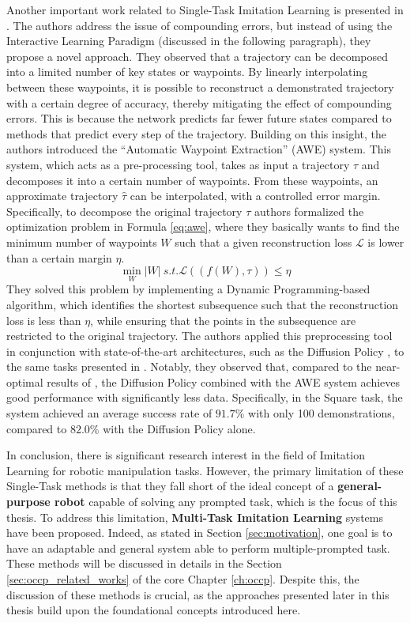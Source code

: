 Another important work related to Single-Task Imitation Learning is presented in \cite{shi2023waypoint}. The authors address the issue of compounding errors, but instead of using the Interactive Learning Paradigm (discussed in the following paragraph), they propose a novel approach. They observed that a trajectory can be decomposed into a limited number of key states or waypoints. By linearly interpolating between these waypoints, it is possible to reconstruct a demonstrated trajectory with a certain degree of accuracy, thereby mitigating the effect of compounding errors. This is because the network predicts far fewer future states compared to methods that predict every step of the trajectory. Building on this insight, the authors introduced the ``Automatic Waypoint Extraction'' (AWE) system. This system, which acts as a pre-processing tool, takes as input a trajectory $\tau$ and decomposes it into a certain number of waypoints. From these waypoints, an approximate trajectory $\hat{\tau}$ can be interpolated, with a controlled error margin.
Specifically, to decompose the original trajectory $\tau$ authors formalized the optimization problem in Formula \ref{eq:awe}, where they basically wants to find the minimum number of waypoints $W$ such that a given reconstruction loss $\mathcal{L}$ is lower than a certain margin $\eta$.
\begin{equation}
    \label{eq:awe}
    \min_{W} |W|  \ s.t. \mathcal{L}((f(W), \tau)) \le \eta
\end{equation}
They solved this problem by implementing a Dynamic Programming-based algorithm, which identifies the shortest subsequence such that the reconstruction loss is less than $\eta$, while ensuring that the points in the subsequence are restricted to the original trajectory. The authors applied this preprocessing tool in conjunction with state-of-the-art architectures, such as the Diffusion Policy \cite{cheng2023diffusion}, to the same tasks presented in \cite{mandlekar2022matters}. Notably, they observed that, compared to the near-optimal results of \cite{cheng2023diffusion}, the Diffusion Policy combined with the AWE system achieves good performance with significantly less data. Specifically, in the Square task, the system achieved an average success rate of $91.7\%$ with only 100 demonstrations, compared to $82.0\%$ with the Diffusion Policy alone.

In conclusion, there is significant research interest in the field of Imitation Learning for robotic manipulation tasks. However, the primary limitation of these Single-Task methods is that they fall short of the ideal concept of a \textbf{general-purpose robot} capable of solving any prompted task, which is the focus of this thesis. To address this limitation, \textbf{Multi-Task Imitation Learning} systems have been proposed. Indeed, as stated in Section \ref{sec:motivation}, one goal is to have an adaptable and general system able to perform multiple-prompted task. These methods will be discussed in details in the Section \ref{sec:occp_related_works} of the core Chapter \ref{ch:occp}. Despite this, the discussion of these methods is crucial, as the approaches presented later in this thesis build upon the foundational concepts introduced here.

